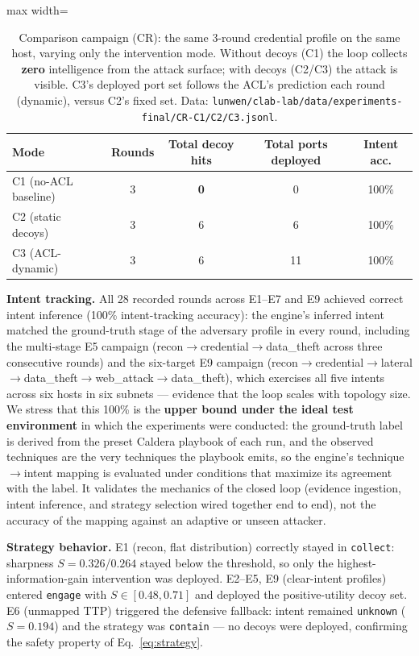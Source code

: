 \documentclass[preprints,article,accept,oneauthor]{Definitions/mdpi}
\newcommand{\act}[1]{\texttt{#1}}
\begin{document}
\begin{table}[ht]
\centering
\begin{adjustbox}{max width=\linewidth}\begin{tabular}{@{}lcccc@{}}
\toprule
\textbf{Mode} & \textbf{Rounds} & \textbf{Total decoy hits} & \textbf{Total ports deployed} & \textbf{Intent acc.} \\
\midrule
C1 (no-ACL baseline) & 3 & \textbf{0} & 0 & 100\% \\
C2 (static decoys) & 3 & 6 & 6 & 100\% \\
C3 (ACL-dynamic) & 3 & 6 & 11 & 100\% \\
\bottomrule
\end{tabular}\end{adjustbox}
\caption{Comparison campaign (CR): the same 3-round credential profile on the
same host, varying only the intervention mode. Without decoys (C1) the loop
collects \textbf{zero} intelligence from the attack surface; with decoys
(C2/C3) the attack is visible. C3's deployed port set follows the ACL's
prediction each round (dynamic), versus C2's fixed set. Data:
\texttt{lunwen/clab-lab/data/experiments-final/CR-C1/C2/C3.jsonl}.}
\label{tab:cr}
\end{table}

\textbf{Intent tracking.} All 28 recorded rounds across E1--E7 and E9 achieved correct
intent inference (100\% intent-tracking accuracy): the engine's inferred
intent matched the ground-truth stage of the adversary profile in every
round, including the multi-stage E5 campaign (recon$\to$credential$\to$data\_theft
across three consecutive rounds) and the six-target E9 campaign
(recon$\to$credential$\to$lateral$\to$data\_theft$\to$web\_attack$\to$data\_theft),
which exercises all five intents across six hosts in six subnets ---
evidence that the loop scales with topology size. We stress that this
100\% is the \textbf{upper bound under the ideal test environment} in which
the experiments were conducted: the ground-truth label is derived from the
preset Caldera playbook of each run, and the observed techniques are the
very techniques the playbook emits, so the engine's technique$\to$intent
mapping is evaluated under conditions that maximize its agreement with the
label. It validates the mechanics of the closed loop (evidence ingestion,
intent inference, and strategy selection wired together end to end), not
the accuracy of the mapping against an adaptive or unseen attacker.

\textbf{Strategy behavior.} E1 (recon, flat distribution) correctly stayed
in \act{collect}: sharpness $S=0.326$/$0.264$ stayed below the threshold, so
only the highest-information-gain intervention was deployed. E2--E5, E9
(clear-intent profiles) entered \act{engage} with $S \in [0.48, 0.71]$ and
deployed the positive-utility decoy set. E6 (unmapped TTP) triggered the
defensive fallback: intent remained \act{unknown} ($S=0.194$) and the
strategy was \act{contain} --- no decoys were deployed, confirming the
safety property of Eq.~\ref{eq:strategy}.
\end{document}
